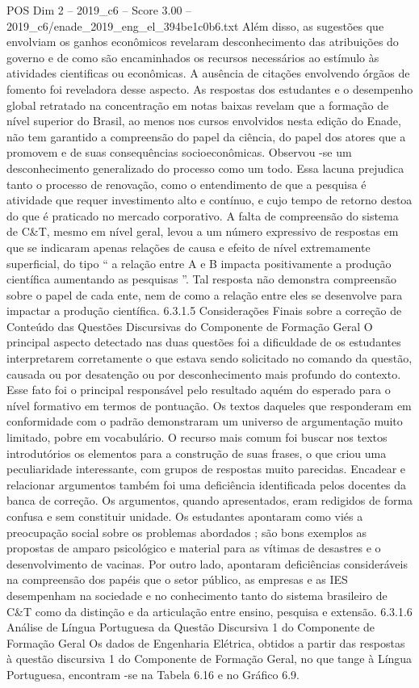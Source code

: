 \begin{textsample}{POS Dim 2 – 2019\_c6 – Score 3.00 – 2019\_c6/enade\_2019\_eng\_el\_394be1c0b6.txt}
Além disso, as sugestões que envolviam os ganhos econômicos revelaram desconhecimento das atribuições do governo e de como são encaminhados os recursos necessários ao estímulo às atividades cientificas ou econômicas.
A ausência de citações envolvendo órgãos de fomento foi reveladora desse aspecto.
As respostas dos estudantes e o desempenho global retratado na concentração em notas baixas revelam que a formação de nível superior do Brasil, ao menos nos cursos envolvidos nesta edição do Enade, não tem garantido a compreensão do papel da ciência, do papel dos atores que a promovem e de suas consequências socioeconômicas.
Observou -se um desconhecimento generalizado do processo como um todo.
Essa lacuna prejudica tanto o processo de renovação, como o entendimento de que a pesquisa é atividade que requer investimento alto e contínuo, e cujo tempo de retorno destoa do que é praticado no mercado corporativo.
A falta de compreensão do sistema de C\&T, mesmo em nível geral, levou a um número expressivo de respostas em que se indicaram apenas relações de causa e efeito de nível extremamente superficial, do tipo “ a relação entre A e B impacta positivamente a produção científica aumentando as pesquisas ”.
Tal resposta não demonstra compreensão sobre o papel de cada ente, nem de como a relação entre eles se desenvolve para impactar a produção científica. 6.3.1.5 Considerações Finais sobre a correção de Conteúdo das Questões Discursivas do Componente de Formação Geral O principal aspecto detectado nas duas questões foi a dificuldade de os estudantes interpretarem corretamente o que estava sendo solicitado no comando da questão, causada ou por desatenção ou por desconhecimento mais profundo do contexto.
Esse fato foi o principal responsável pelo resultado aquém do esperado para o nível formativo em termos de pontuação.
Os textos daqueles que responderam em conformidade com o padrão demonstraram um universo de argumentação muito limitado, pobre em vocabulário.
O recurso mais comum foi buscar nos textos introdutórios os elementos para a construção de suas frases, o que criou uma peculiaridade interessante, com grupos de respostas muito parecidas.
Encadear e relacionar argumentos também foi uma deficiência identificada pelos docentes da banca de correção.
Os argumentos, quando apresentados, eram redigidos de forma confusa e sem constituir unidade.
Os estudantes apontaram como viés a preocupação social sobre os problemas abordados ; são bons exemplos as propostas de amparo psicológico e material para as vítimas de desastres e o desenvolvimento de vacinas.
Por outro lado, apontaram deficiências consideráveis na compreensão dos papéis que o setor público, as empresas e as IES desempenham na sociedade e no conhecimento tanto do sistema brasileiro de C\&T como da distinção e da articulação entre ensino, pesquisa e extensão. 6.3.1.6 Análise de Língua Portuguesa da Questão Discursiva 1 do Componente de Formação Geral Os dados de Engenharia Elétrica, obtidos a partir das respostas à questão discursiva 1 do Componente de Formação Geral, no que tange à Língua Portuguesa, encontram -se na Tabela 6.16 e no Gráfico 6.9.

\end{textsample}
